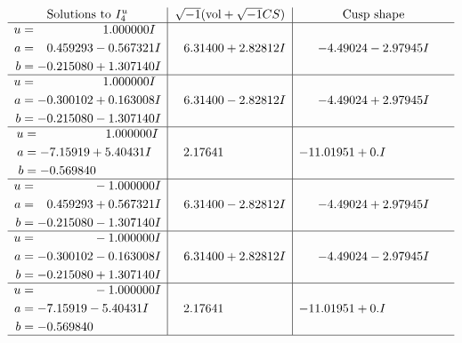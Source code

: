 \documentclass[1p]{elsarticle_modified}
\theoremstyle{definition}
\newcommand{\I}{\sqrt{-1}}
\begin{document}
$$\begin{array}{c|c|c}  
\text{Solutions to }I^u_{4}& \I (\text{vol} + \sqrt{-1}CS) & \text{Cusp shape}\\
 \hline 
\begin{aligned}
u &= \phantom{-0.000000 -}1.000000 I \\
a &= \phantom{-}0.459293 - 0.567321 I \\
b &= -0.215080 + 1.307140 I\end{aligned}
 & \phantom{-}6.31400 + 2.82812 I & -4.49024 - 2.97945 I \\ \hline\begin{aligned}
u &= \phantom{-0.000000 -}1.000000 I \\
a &= -0.300102 + 0.163008 I \\
b &= -0.215080 - 1.307140 I\end{aligned}
 & \phantom{-}6.31400 - 2.82812 I & -4.49024 + 2.97945 I \\ \hline\begin{aligned}
u &= \phantom{-0.000000 -}1.000000 I \\
a &= -7.15919 + 5.40431 I \\
b &= -0.569840\phantom{ +0.000000I}\end{aligned}
 & \phantom{-}2.17641\phantom{ +0.000000I} & -11.01951 + 0. I\phantom{ +0.000000I} \\ \hline\begin{aligned}
u &= \phantom{-0.000000 } -1.000000 I \\
a &= \phantom{-}0.459293 + 0.567321 I \\
b &= -0.215080 - 1.307140 I\end{aligned}
 & \phantom{-}6.31400 - 2.82812 I & -4.49024 + 2.97945 I \\ \hline\begin{aligned}
u &= \phantom{-0.000000 } -1.000000 I \\
a &= -0.300102 - 0.163008 I \\
b &= -0.215080 + 1.307140 I\end{aligned}
 & \phantom{-}6.31400 + 2.82812 I & -4.49024 - 2.97945 I \\ \hline\begin{aligned}
u &= \phantom{-0.000000 } -1.000000 I \\
a &= -7.15919 - 5.40431 I \\
b &= -0.569840\phantom{ +0.000000I}\end{aligned}
 & \phantom{-}2.17641\phantom{ +0.000000I} & -11.01951 + 0. I\phantom{ +0.000000I}\\
 \hline 
 \end{array}$$\newpage\newpage\renewcommand{\arraystretch}{1}
\end{document}
